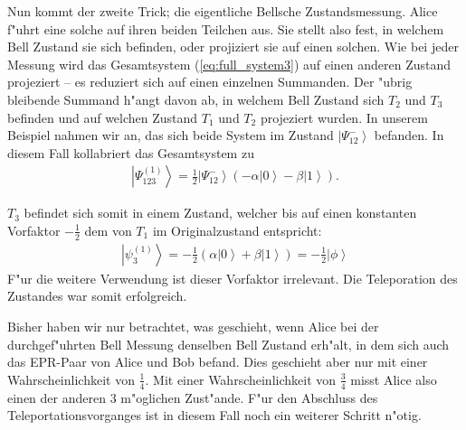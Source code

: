 \begin{refsection}
Nun kommt der zweite Trick; die eigentliche Bellsche Zustandsmessung. Alice f"uhrt eine solche auf ihren beiden Teilchen aus. Sie stellt also fest, in welchem Bell Zustand sie sich befinden, oder projiziert sie auf einen solchen. Wie bei jeder Messung wird das Gesamtsystem (\ref{eq:full_system3}) auf einen anderen Zustand projeziert -- es reduziert sich auf einen einzelnen Summanden. Der "ubrig bleibende Summand h"angt davon ab, in welchem Bell Zustand sich $T_{2}$ und $T_{3}$ befinden und auf welchen Zustand $T_{1}$ und $T_{2}$ projeziert wurden. In unserem Beispiel nahmen wir an, das sich beide System im Zustand $\left|\Psi_{12}^{-}\right\rangle$ befanden. In diesem Fall kollabriert das Gesamtsystem zu
\begin{align}
\left| \Psi_{123}^{(1)} \right\rangle = \frac{1}{2} \left| \Psi_{12}^{-} \right \rangle (-\alpha \left| 0 \right \rangle - \beta \left| 1 \right\rangle).
\end{align}

$T_{3}$ befindet sich somit in einem Zustand, welcher bis auf einen konstanten Vorfaktor $-\frac{1}{2}$ dem von $T_{1}$ im Originalzustand entspricht:
\begin{align}
\left| \psi_{3}^{(1)} \right\rangle = - \frac{1}{2} \left( \alpha \left| 0 \right \rangle + \beta \left| 1 \right \rangle \right ) = - \frac{1}{2} \left| \phi \right \rangle
\end{align}
F"ur die weitere Verwendung ist dieser Vorfaktor irrelevant. Die Teleporation des Zustandes war somit erfolgreich. 

Bisher haben wir  nur betrachtet, was geschieht, wenn Alice bei der durchgef"uhrten Bell Messung denselben Bell Zustand erh"alt, in dem sich auch das EPR-Paar von Alice und Bob befand. Dies geschieht aber nur mit einer Wahrscheinlichkeit von $\frac{1}{4}$. Mit einer Wahrscheinlichkeit von $\frac{3}{4}$ misst Alice also einen der anderen 3 m"oglichen Zust"ande. F"ur den Abschluss des Teleportationsvorganges ist in diesem Fall noch ein weiterer Schritt n"otig.


\end{refsection}
